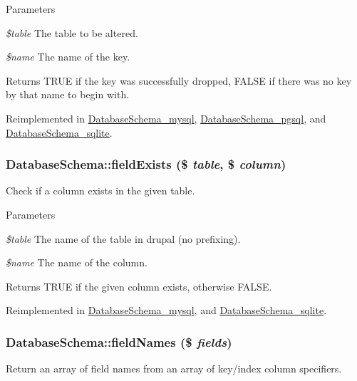 \begin{DoxyParams}{Parameters}
\item[{\em \$table}]The table to be altered. \item[{\em \$name}]The name of the key.\end{DoxyParams}
\begin{DoxyReturn}{Returns}
TRUE if the key was successfully dropped, FALSE if there was no key by that name to begin with. 
\end{DoxyReturn}


Reimplemented in \hyperlink{classDatabaseSchema__mysql_a7301360fe0f030204827f75495448c41}{DatabaseSchema\_\-mysql}, \hyperlink{classDatabaseSchema__pgsql_a1fd8f4f016bf0b242448dc60506ab6cf}{DatabaseSchema\_\-pgsql}, and \hyperlink{classDatabaseSchema__sqlite_a93c409d48623019e1a5c1a2ff881c2c7}{DatabaseSchema\_\-sqlite}.\hypertarget{classDatabaseSchema_a1f657a73ea94b4fa0de1d1954350b4e7}{
\subsubsection[{fieldExists}]{\setlength{\rightskip}{0pt plus 5cm}DatabaseSchema::fieldExists (\$ {\em table}, \/  \$ {\em column})}}
\label{classDatabaseSchema_a1f657a73ea94b4fa0de1d1954350b4e7}
Check if a column exists in the given table.


\begin{DoxyParams}{Parameters}
\item[{\em \$table}]The name of the table in drupal (no prefixing). \item[{\em \$name}]The name of the column.\end{DoxyParams}
\begin{DoxyReturn}{Returns}
TRUE if the given column exists, otherwise FALSE. 
\end{DoxyReturn}


Reimplemented in \hyperlink{classDatabaseSchema__mysql_a3f375da9ca1d0e8c7000820366457256}{DatabaseSchema\_\-mysql}, and \hyperlink{classDatabaseSchema__sqlite_a0ed3e65a49d4d1fc0db835ed5e49bf45}{DatabaseSchema\_\-sqlite}.\hypertarget{classDatabaseSchema_a7255734df8d5b7a1475f8cd0d8320e06}{
\subsubsection[{fieldNames}]{\setlength{\rightskip}{0pt plus 5cm}DatabaseSchema::fieldNames (\$ {\em fields})}}
\label{classDatabaseSchema_a7255734df8d5b7a1475f8cd0d8320e06}
Return an array of field names from an array of key/index column specifiers.

